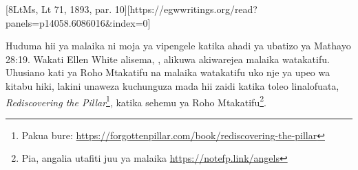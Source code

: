 [8LtMs, Lt 71, 1893, par. 10][https://egwwritings.org/read?panels=p14058.6086016&index=0]

Huduma hii ya malaika ni moja ya vipengele katika ahadi ya ubatizo ya Mathayo 28:19. Wakati Ellen White alisema, , alikuwa akiwarejea malaika watakatifu. Uhusiano kati ya Roho Mtakatifu na malaika watakatifu uko nje ya upeo wa kitabu hiki, lakini unaweza kuchunguza mada hii zaidi katika toleo linalofuata, \textit{Rediscovering the Pillar}\footnote{Pakua bure: \href{https://forgottenpillar.com/book/rediscovering-the-pillar}{https://forgottenpillar.com/book/rediscovering-the-pillar}}, katika sehemu ya Roho Mtakatifu\footnote{Pia, angalia utafiti juu ya malaika \href{https://notefp.link/angels}{https://notefp.link/angels}}.


